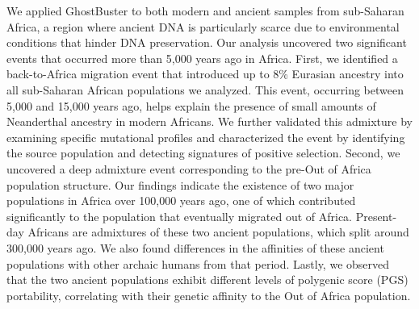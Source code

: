 We applied GhostBuster to both modern and ancient samples from sub-Saharan Africa, a region where ancient DNA is particularly scarce due to environmental conditions that hinder DNA preservation. Our analysis uncovered two significant events that occurred more than 5,000 years ago in Africa. First, we identified a back-to-Africa migration event that introduced up to 8\% Eurasian ancestry into all sub-Saharan African populations we analyzed. This event, occurring between 5,000 and 15,000 years ago, helps explain the presence of small amounts of Neanderthal ancestry in modern Africans. We further validated this admixture by examining specific mutational profiles and characterized the event by identifying the source population and detecting signatures of positive selection. Second, we uncovered a deep admixture event corresponding to the pre-Out of Africa population structure. Our findings indicate the existence of two major populations in Africa over 100,000 years ago, one of which contributed significantly to the population that eventually migrated out of Africa. Present-day Africans are admixtures of these two ancient populations, which split around 300,000 years ago. We also found differences in the affinities of these ancient populations with other archaic humans from that period. Lastly, we observed that the two ancient populations exhibit different levels of polygenic score (PGS) portability, correlating with their genetic affinity to the Out of Africa population.









